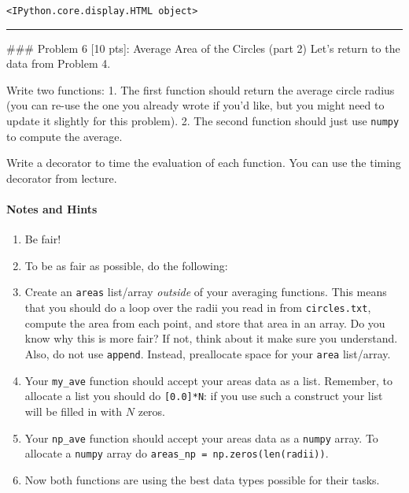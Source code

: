 \documentclass[11pt]{article}
\providecommand{\tightlist}{%
      \setlength{\itemsep}{0pt}\setlength{\parskip}{0pt}}
\begin{document}
    
    \begin{verbatim}
<IPython.core.display.HTML object>
    \end{verbatim}

    
    \begin{center}\rule{0.5\linewidth}{\linethickness}\end{center}

 \#\#\# Problem 6 {[}10 pts{]}: Average Area of the Circles (part 2)
Let's return to the data from Problem 4.

Write two functions: 1. The first function should return the average
circle radius (you can re-use the one you already wrote if you'd like,
but you might need to update it slightly for this problem). 2. The
second function should just use \texttt{numpy} to compute the average.

Write a decorator to time the evaluation of each function. You can use
the timing decorator from lecture.

\paragraph{Notes and Hints}\label{notes-and-hints}

\begin{enumerate}
\def\labelenumi{\arabic{enumi}.}
\tightlist
\item
  Be fair!
\item
  To be as fair as possible, do the following:
\item
  Create an \texttt{areas} list/array \emph{outside} of your averaging
  functions. This means that you should do a loop over the radii you
  read in from \texttt{circles.txt}, compute the area from each point,
  and store that area in an array. Do you know why this is more fair? If
  not, think about it make sure you understand. Also, do not use
  \texttt{append}. Instead, preallocate space for your \texttt{area}
  list/array.
\item
  Your \texttt{my\_ave} function should accept your areas data as a
  list. Remember, to allocate a list you should do \texttt{{[}0.0{]}*N}:
  if you use such a construct your list will be filled in with \(N\)
  zeros.
\item
  Your \texttt{np\_ave} function should accept your areas data as a
  \texttt{numpy} array. To allocate a \texttt{numpy} array do
  \texttt{areas\_np\ =\ np.zeros(len(radii))}.
\item
  Now both functions are using the best data types possible for their
  tasks.
\end{enumerate}
\end{document}
